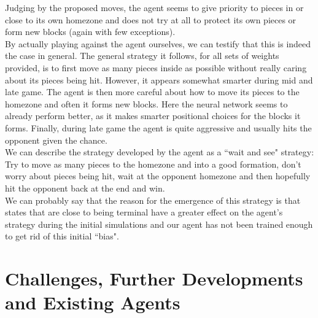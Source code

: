 \documentclass[11pt, a4paper, twoside]{amsart} %
\theoremstyle{definition}
\begin{document}
Judging by the proposed moves, the agent seems to give priority to pieces in or close to its own homezone and does not try at all to protect its own pieces or form new blocks (again with few exceptions).\\ 
By actually playing against the agent ourselves, we can testify that this is indeed the case in general. The general strategy it follows, for all sets of weights provided, is to first move as many pieces inside as possible without really caring about its pieces being hit. However, it appears somewhat smarter during mid and late game. The agent is then more careful about how to move its pieces to the homezone and often it forms new blocks. Here the neural network seems to already perform better, as it makes smarter positional choices for the blocks it forms. Finally, during late game the agent is quite aggressive and usually hits the opponent given the chance.\\
We can describe the strategy developed by the agent as a ``wait and see" strategy: Try to move as many pieces to the homezone and into a good formation, don't worry about pieces being hit, wait at the opponent homezone and then hopefully hit the opponent back at the end and win.\\
We can probably say that the reason for the emergence of this strategy is that states that are close to being terminal have a greater effect on the agent's strategy during the initial simulations and our agent has not been trained enough to get rid of this initial ``bias".

\section{Challenges, Further Developments and Existing Agents}
\end{document}
